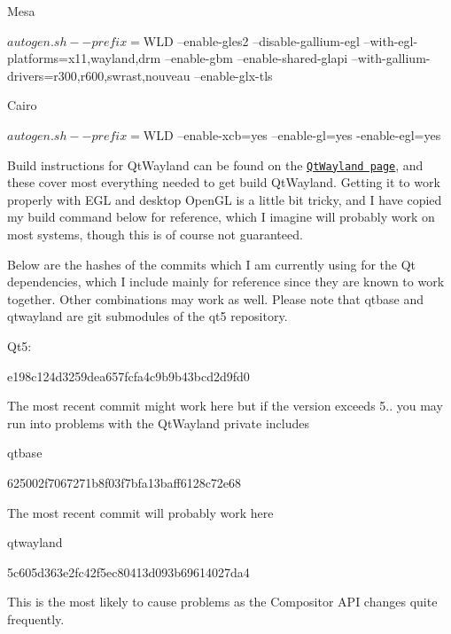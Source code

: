 \begin{DoxyItemize}
\item Mesa \begin{DoxyVerb}  $ autogen.sh --prefix=$WLD --enable-gles2 --disable-gallium-egl --with-egl-platforms=x11,wayland,drm --enable-gbm --enable-shared-glapi --with-gallium-drivers=r300,r600,swrast,nouveau --enable-glx-tls
\end{DoxyVerb}

\item Cairo \begin{DoxyVerb}  $ autogen.sh --prefix=$WLD --enable-xcb=yes --enable-gl=yes -enable-egl=yes
\end{DoxyVerb}

\end{DoxyItemize}

Build instructions for Qt\-Wayland can be found on the \href{http://qt-project.org/wiki/QtWayland}{\tt Qt\-Wayland page}, and these cover most everything needed to get build Qt\-Wayland. Getting it to work properly with E\-G\-L and desktop Open\-G\-L is a little bit tricky, and I have copied my build command below for reference, which I imagine will probably work on most systems, though this is of course not guaranteed.

Below are the hashes of the commits which I am currently using for the Qt dependencies, which I include mainly for reference since they are known to work together. Other combinations may work as well. Please note that qtbase and qtwayland are git submodules of the qt5 repository.


\begin{DoxyItemize}
\item Qt5\-:
\begin{DoxyItemize}
\item e198c124d3259dea657fcfa4c9b9b43bcd2d9fd0
\item The most recent commit might work here but if the version exceeds 5.. you may run into problems with the Qt\-Wayland private includes
\end{DoxyItemize}
\item qtbase
\begin{DoxyItemize}
\item 625002f7067271b8f03f7bfa13baff6128c72e68
\item The most recent commit will probably work here
\end{DoxyItemize}
\item qtwayland
\begin{DoxyItemize}
\item 5c605d363e2fc42f5ec80413d093b69614027da4
\item This is the most likely to cause problems as the Compositor A\-P\-I changes quite frequently.
\end{DoxyItemize}
\end{DoxyItemize}


